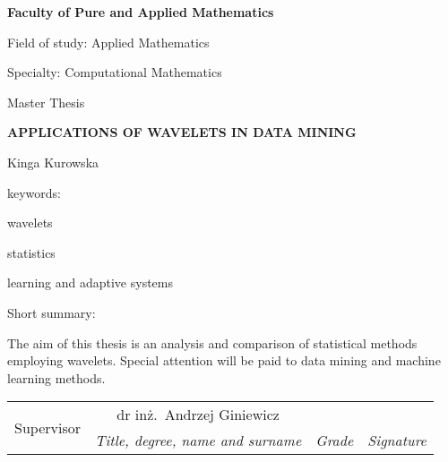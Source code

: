 \documentclass[12pt,a4paper,twoside]{book}
\begin{document}
\begin{titlepage}
\noindent\textbf{\large Faculty of Pure and Applied Mathematics}
\par\medskip\noindent
Field of study: Applied Mathematics
\par\noindent
Specialty: Computational Mathematics
\vspace*{36pt}
\begin{center}
\LARGE Master Thesis
\end{center}
\vspace*{24pt}
\begin{center}
\uppercase{\Large\bfseries%
Applications of Wavelets in Data Mining}
\end{center}
\vspace*{12pt}
\begin{center}
Kinga Kurowska
\end{center}
\vspace*{12pt}
\begin{flushright}
keywords:\par\noindent
wavelets\par\noindent
statistics\par\noindent
learning and adaptive systems\par\noindent
\end{flushright}
\begin{flushleft}
Short summary:\par
The aim of this thesis is an analysis and comparison of statistical methods employing wavelets. Special attention will be paid to data mining and machine learning methods.
\smallskip
\end{flushleft}
\begin{tabularx}{\textwidth}{|l|c|X|X|}
	\hline
	\multirow{2}{*}{\footnotesize Supervisor} & {\small dr inż.\ Andrzej Giniewicz} &  &  \\
	\cline{2-4}
	& \textit{\footnotesize Title, degree, name and surname} & \textit{\footnotesize Grade} & \textit{\footnotesize Signature} \\
	\hline
\end{tabularx}

\end{titlepage}
\end{document}
